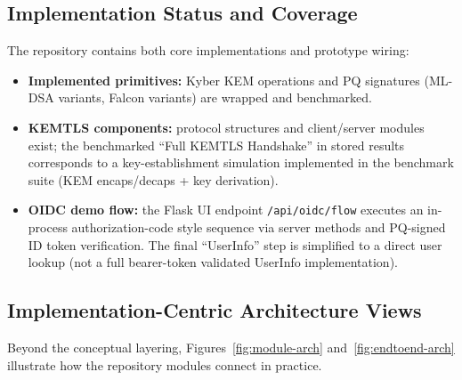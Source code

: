 \documentclass[conference]{IEEEtran}
\begin{document}
                \subsection{Implementation Status and Coverage}
                The repository contains both core implementations and prototype wiring:
                \begin{itemize}
                  \item \textbf{Implemented primitives:} Kyber KEM operations and PQ signatures (ML-DSA variants, Falcon variants) are wrapped and benchmarked.
                  \item \textbf{KEMTLS components:} protocol structures and client/server modules exist; the benchmarked ``Full KEMTLS Handshake'' in stored results corresponds to a key-establishment simulation implemented in the benchmark suite (KEM encaps/decaps + key derivation).
                  \item \textbf{OIDC demo flow:} the Flask UI endpoint \texttt{/api/oidc/flow} executes an in-process authorization-code style sequence via server methods and PQ-signed ID token verification. The final ``UserInfo'' step is simplified to a direct user lookup (not a full bearer-token validated UserInfo implementation).
                \end{itemize}
                \subsection{Implementation-Centric Architecture Views}
                Beyond the conceptual layering, Figures~\ref{fig:module-arch} and~\ref{fig:endtoend-arch} illustrate how the repository modules connect in practice.
                
\end{document}
